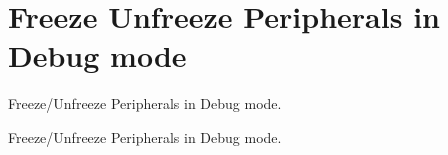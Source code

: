 \hypertarget{group___d_b_g_m_c_u___freeze___unfreeze}{\section{Freeze Unfreeze Peripherals in Debug mode}
\label{group___d_b_g_m_c_u___freeze___unfreeze}
}


Freeze/\-Unfreeze Peripherals in Debug mode.  


Freeze/\-Unfreeze Peripherals in Debug mode. 